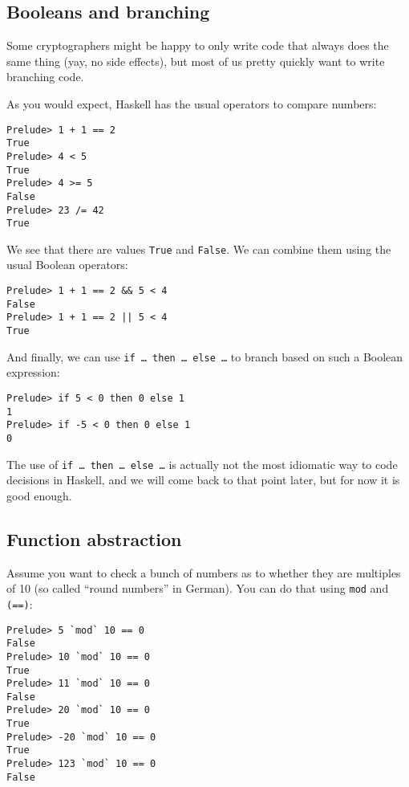 \documentclass[11pt,
  american,
  DIV13]{article}
\begin{document}
\hypertarget{booleans-and-branching}{%
\subsection{Booleans and branching}\label{booleans-and-branching}}

Some cryptographers might be happy to only write code that always does
the same thing (yay, no side effects), but most of us pretty quickly
want to write branching code.

As you would expect, Haskell has the usual operators to compare numbers:

\begin{verbatim}
Prelude> 1 + 1 == 2
True
Prelude> 4 < 5
True
Prelude> 4 >= 5
False
Prelude> 23 /= 42
True
\end{verbatim}

We see that there are values \texttt{True} and \texttt{False}. We can
combine them using the usual Boolean operators:

\begin{verbatim}
Prelude> 1 + 1 == 2 && 5 < 4
False
Prelude> 1 + 1 == 2 || 5 < 4
True
\end{verbatim}

And finally, we can use
\texttt{if\ \ldots{}\ then\ \ldots{}\ else\ \ldots{}} to branch based on
such a Boolean expression:

\begin{verbatim}
Prelude> if 5 < 0 then 0 else 1
1
Prelude> if -5 < 0 then 0 else 1
0
\end{verbatim}

The use of \texttt{if\ \ldots{}\ then\ \ldots{}\ else\ \ldots{}} is
actually not the most idiomatic way to code decisions in Haskell, and we
will come back to that point later, but for now it is good enough.

\hypertarget{function-abstraction}{%
\subsection{Function abstraction}\label{function-abstraction}}

Assume you want to check a bunch of numbers as to whether they are
multiples of 10 (so called ``round numbers'' in German). You can do that
using \texttt{mod} and \texttt{(==)}:

\begin{verbatim}
Prelude> 5 `mod` 10 == 0
False
Prelude> 10 `mod` 10 == 0
True
Prelude> 11 `mod` 10 == 0
False
Prelude> 20 `mod` 10 == 0
True
Prelude> -20 `mod` 10 == 0
True
Prelude> 123 `mod` 10 == 0
False
\end{verbatim}
\end{document}
